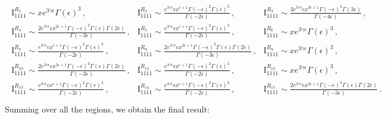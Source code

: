 \documentclass{article}
\begin{document}
\begin{align}
\begin{array}{lll}
 \text{I}_{1111}^{R_1}\sim x e^{3 \gamma  \epsilon } \Gamma (\epsilon )^3\,, & \text{I}_{1111}^{R_2}\sim \frac{e^{3 \gamma  \epsilon } \epsilon  x^{\epsilon +1} \Gamma (-\epsilon )^2 \Gamma (\epsilon )^3}{\Gamma (-2 \epsilon )}\,, & \text{I}_{1111}^{R_3}\sim \frac{3 e^{3 \gamma  \epsilon } \epsilon  x^{3 \epsilon +1} \Gamma (-\epsilon )^4 \Gamma (3 \epsilon )}{\Gamma (-4 \epsilon )}\,, \\
 \text{I}_{1111}^{R_4}\sim \frac{2 e^{3 \gamma  \epsilon } \epsilon  x^{2 \epsilon +1} \Gamma (-\epsilon )^3 \Gamma (\epsilon ) \Gamma (2 \epsilon )}{\Gamma (-3 \epsilon )}\,, & \text{I}_{1111}^{R_5}\sim \frac{e^{3 \gamma  \epsilon } \epsilon  x^{\epsilon +1} \Gamma (-\epsilon )^2 \Gamma (\epsilon )^3}{\Gamma (-2 \epsilon )}\,, & \text{I}_{1111}^{R_6}\sim x e^{3 \gamma  \epsilon } \Gamma (\epsilon )^3\,, \\
 \text{I}_{1111}^{R_7}\sim \frac{e^{3 \gamma  \epsilon } \epsilon  x^{\epsilon +1} \Gamma (-\epsilon )^2 \Gamma (\epsilon )^3}{\Gamma (-2 \epsilon )}\,, & \text{I}_{1111}^{R_8}\sim \frac{2 e^{3 \gamma  \epsilon } \epsilon  x^{2 \epsilon +1} \Gamma (-\epsilon )^3 \Gamma (\epsilon ) \Gamma (2 \epsilon )}{\Gamma (-3 \epsilon )}\,, & \text{I}_{1111}^{R_9}\sim x e^{3 \gamma  \epsilon } \Gamma (\epsilon )^3\,, \\
 \text{I}_{1111}^{R_{10}}\sim \frac{2 e^{3 \gamma  \epsilon } \epsilon  x^{2 \epsilon +1} \Gamma (-\epsilon )^3 \Gamma (\epsilon ) \Gamma (2 \epsilon )}{\Gamma (-3 \epsilon )}\,, & \text{I}_{1111}^{R_{11}}\sim \frac{e^{3 \gamma  \epsilon } \epsilon  x^{\epsilon +1} \Gamma (-\epsilon )^2 \Gamma (\epsilon )^3}{\Gamma (-2 \epsilon )}\,, & \text{I}_{1111}^{R_{12}}\sim x e^{3 \gamma  \epsilon } \Gamma (\epsilon )^3\,, \\
 \text{I}_{1111}^{R_{13}}\sim \frac{e^{3 \gamma  \epsilon } \epsilon  x^{\epsilon +1} \Gamma (-\epsilon )^2 \Gamma (\epsilon )^3}{\Gamma (-2 \epsilon )}\,, & \text{I}_{1111}^{R_{14}}\sim \frac{e^{3 \gamma  \epsilon } \epsilon  x^{\epsilon +1} \Gamma (-\epsilon )^2 \Gamma (\epsilon )^3}{\Gamma (-2 \epsilon )}\,, & \text{I}_{1111}^{R_{15}}\sim \frac{2 e^{3 \gamma  \epsilon } \epsilon  x^{2 \epsilon +1} \Gamma (-\epsilon )^3 \Gamma (\epsilon ) \Gamma (2 \epsilon )}{\Gamma (-3 \epsilon )}\,. \\
\end{array}
\end{align}
Summing over all the regions, we obtain the final result:
\end{document}
